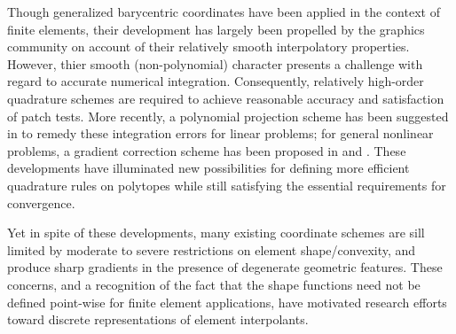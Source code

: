 		Though generalized barycentric coordinates have been applied in the context of finite elements, their development has largely been propelled by the graphics community on account of their relatively smooth interpolatory properties. However, thier smooth (non-polynomial) character presents a challenge with regard to accurate numerical integration. Consequently, relatively high-order quadrature schemes are required to achieve reasonable accuracy and satisfaction of patch tests. More recently, a polynomial projection scheme has been suggested in \cite{Talischi:14} to remedy these integration errors for linear problems; for general nonlinear problems, a gradient correction scheme has been proposed in \cite{Talischi:15} and \cite{Chi:16}. These developments have illuminated new possibilities for defining more efficient quadrature rules on polytopes while still satisfying the essential requirements for convergence.
		
		Yet in spite of these developments, many existing coordinate schemes are sill limited by moderate to severe restrictions on element shape/convexity, and produce sharp gradients in the presence of degenerate geometric features. These concerns, and a recognition of the fact that the shape functions need not be defined point-wise for finite element applications, have motivated research efforts toward discrete representations of element interpolants.

